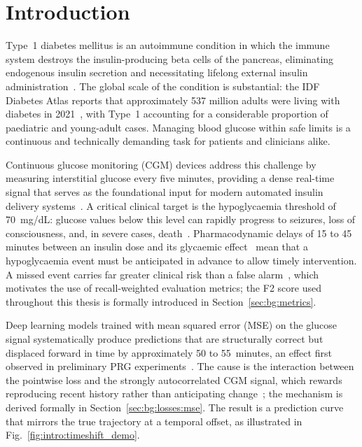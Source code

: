 \chapter{Introduction}
\label{ch:introduction}

Type~1 diabetes mellitus is an autoimmune condition in which the immune system destroys the insulin-producing beta cells of the pancreas, eliminating endogenous insulin secretion and necessitating lifelong external insulin administration~\citep{dimeglio2018t1d}. The global scale of the condition is substantial: the IDF Diabetes Atlas reports that approximately 537 million adults were living with diabetes in 2021~\citep{sun2022idfatlas}, with Type~1 accounting for a considerable proportion of paediatric and young-adult cases. Managing blood glucose within safe limits is a continuous and technically demanding task for patients and clinicians alike.

Continuous glucose monitoring (CGM) devices address this challenge by measuring interstitial glucose every five minutes, providing a dense real-time signal that serves as the foundational input for modern automated insulin delivery systems~\citep{bekiari2018aid}. A critical clinical target is the hypoglycaemia threshold of 70~mg/dL: glucose values below this level can rapidly progress to seizures, loss of consciousness, and, in severe cases, death~\citep{battelino2019}. Pharmacodynamic delays of 15 to 45 minutes between an insulin dose and its glycaemic effect~\citep{hovorka2011closedloop} mean that a hypoglycaemia event must be anticipated in advance to allow timely intervention. A missed event carries far greater clinical risk than a false alarm~\citep{battelino2019}, which motivates the use of recall-weighted evaluation metrics; the F2 score used throughout this thesis is formally introduced in Section~\ref{sec:bg:metrics}.

Deep learning models trained with mean squared error (MSE) on the glucose signal systematically produce predictions that are structurally correct but displaced forward in time by approximately 50 to 55~minutes, an effect first observed in preliminary PRG experiments~\citep{prg_glucose_proposal}. The cause is the interaction between the pointwise loss and the strongly autocorrelated CGM signal, which rewards reproducing recent history rather than anticipating change~\citep{wolff2025cgpm}; the mechanism is derived formally in Section~\ref{sec:bg:losses:mse}. The result is a prediction curve that mirrors the true trajectory at a temporal offset, as illustrated in Fig.~\ref{fig:intro:timeshift_demo}.

